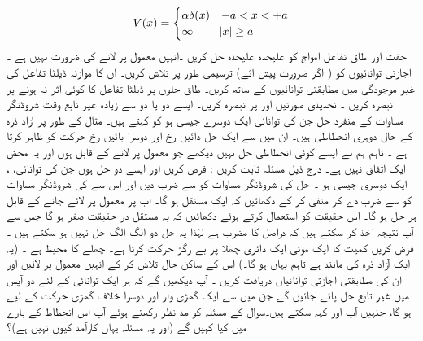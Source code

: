 \begin{align*}
V(x)=
\begin{cases}
\alpha\delta (x)& -a< x< +a\\
\infty &\abs{x}\ge a
\end{cases}
 \end{align*} 
 جفت اور طاق تفاعل امواج کو علیحدہ علیحدہ حل کریں ۔انہیں معمول پر لانے کی ضرورت نہیں ہے ۔ اجازتی توانائیوں کو ( اگر ضرورت  پیش آئے)  ترسیمی طور پر تلاش کریں۔ ان کا موازنہ ڈیلٹا تفاعل کی غیر موجودگی میں مطابقتی  توانائیوں کے ساتھ کریں۔  طاق حلوں پر   ڈیلٹا تفاعل کا کوئی اثر نہ ہونے پر تبصرہ کریں ۔ تحدیدی صورتیں   اور پر  تبصرہ کریں۔ 
 ایسے دو یا دو سے زیادہ  غیر تابع وقت  شروڈنگر  مساوات کے منفرد  حل جن کی توانائی  ایک دوسرے جیسی ہو  کو  کہتے ہیں۔ مثال کے طور پر آزاد ذرہ  کے حال  دوہری انحطاطی ہیں۔  ان میں سے ایک حل دائیں رخ اور دوسرا بائیں رخ حرکت کو ظاہر کرتا ہے ۔  تاہم  ہم نے ایسے کوئی انحطاطی حل نہیں دیکھے جو معمول پر لانے کے قابل ہوں اور یہ محض ایک اتفاق نہیں ہے۔ 
 درج ذیل مسئلہ ثابت کریں : 
  فرض کریں
  اور  ایسے دو حل ہوں جن کی توانائی،  ،   ایک دوسری  جیسی ہو ۔  حل  کی شروڈنگر  مساوات کو  سے  ضرب دیں اور اس سے کی  شروڈنگر مساوات کو  سے ضرب دے کر منفی کر کے  دکھائیں کہ  ایک مستقل ہو گا۔
 اب    پر     معمول پر لائے جانے کے  قابل ہر حل     ہو گا۔  اس حقیقت کو استعمال کرتے ہوئے دکھائیں کہ یہ مستقل در حقیقت صفر ہو گا جس سے آپ   نتیجہ اخذ کر سکتے ہیں کہ  دراصل  کا مضرب ہے   لہٰذا یہ  حل دو  الگ الگ حل  نہیں ہو سکتے ہیں ۔
فرض کریں کمیت    کا ایک موتی  ایک دائری چھلا  پر  بے رگڑ حرکت کرتا ہے۔ چھلے کا محیط  ہے ۔ (یہ ایک آزاد ذرہ کی مانند  ہے تاہم یہاں ہو گا۔)   اس کے ساکن حال تلاش کر کے  انہیں معمول پر لائیں اور ان کی  مطابقتی  اجازتی  توانائیاں دریافت  کریں ۔  آپ دیکھیں گے کہ ہر ایک توانائی کے لئے دو آپس میں غیر تابع حل پائے جائیں گے جن میں سے ایک گھڑی وار اور دوسرا خلاف گھڑی حرکت کے لیے ہو گا،  جنہیں آپ اور  کہہ سکتے ہیں۔سوال  کے مسئلہ  کو مد نظر رکھتے ہوئے آپ اس  انحطاط کے بارے میں کیا کہیں گے  (اور یہ مسئلہ یہاں کارآمد کیوں نہیں ہے)؟  

